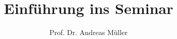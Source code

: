 %
%
%


\beamertemplatenavigationsymbolsempty
\title[1. Sitzung]{Einführung ins Seminar}
\author[A.~Müller]{Prof. Dr. Andreas Müller}
\date[]{}

